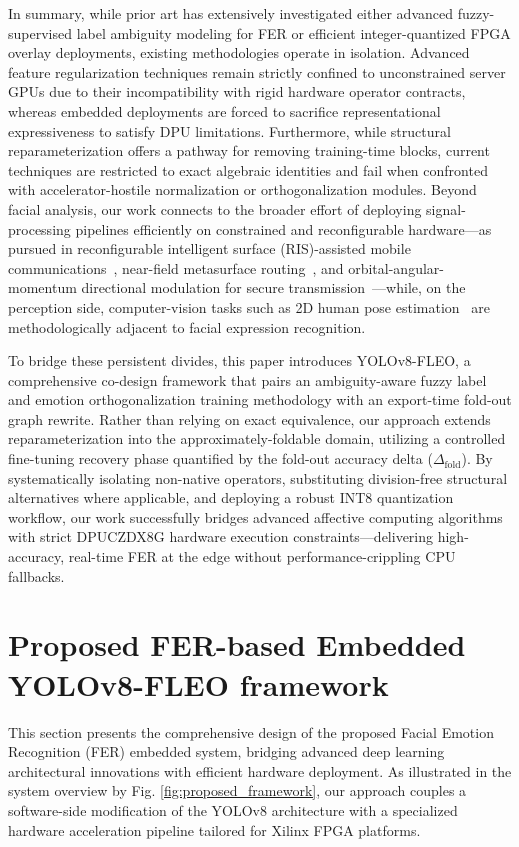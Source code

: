 \documentclass[algorithms,article,submit,moreauthors]{Definitions/mdpi}
\newcommand{\rev}[1]{\textcolor{revcolor}{#1}}
\begin{document}
In summary, while prior art has extensively investigated either advanced fuzzy-supervised label ambiguity modeling for FER or efficient integer-quantized FPGA overlay deployments, existing methodologies operate in isolation. Advanced feature regularization techniques remain strictly confined to unconstrained server GPUs due to their incompatibility with rigid hardware operator contracts, whereas embedded deployments are forced to sacrifice representational expressiveness to satisfy DPU limitations. Furthermore, while structural reparameterization offers a pathway for removing training-time blocks, current techniques are restricted to exact algebraic identities and fail when confronted with accelerator-hostile normalization or orthogonalization modules. 
\rev{Beyond facial analysis, our work connects to the broader effort of deploying signal-processing
pipelines efficiently on constrained and reconfigurable hardware---as pursued in reconfigurable
intelligent surface (RIS)-assisted mobile communications~\cite{ref_ris}, near-field metasurface
routing~\cite{ref_meta}, and orbital-angular-momentum directional modulation for secure
transmission~\cite{ref_oam}---while, on the perception side, computer-vision tasks such as 2D
human pose estimation~\cite{ref_pose} are methodologically adjacent to facial expression
recognition.   }


To bridge these persistent divides, this paper introduces YOLOv8-FLEO, a comprehensive co-design framework that pairs an ambiguity-aware fuzzy label and emotion orthogonalization training methodology with an export-time fold-out graph rewrite. Rather than relying on exact equivalence, our approach extends reparameterization into the approximately-foldable domain, utilizing a controlled fine-tuning recovery phase quantified by the fold-out accuracy delta ($\Delta_{\mathrm{fold}}$). By systematically isolating non-native operators, substituting division-free structural alternatives where applicable, and deploying a robust INT8 quantization workflow, our work successfully bridges advanced affective computing algorithms with strict DPUCZDX8G hardware execution constraints—delivering high-accuracy, real-time FER at the edge without performance-crippling CPU fallbacks.

\section{Proposed FER-based Embedded YOLOv8-FLEO framework}\label{sec:method}
This section presents the comprehensive design of the proposed Facial Emotion Recognition (FER) embedded system, bridging advanced deep learning architectural innovations with efficient hardware deployment. As illustrated in the system overview by Fig. \ref{fig:proposed_framework}, our approach couples a software-side modification of the YOLOv8 architecture with a specialized hardware acceleration pipeline tailored for Xilinx FPGA platforms.
\end{document}
